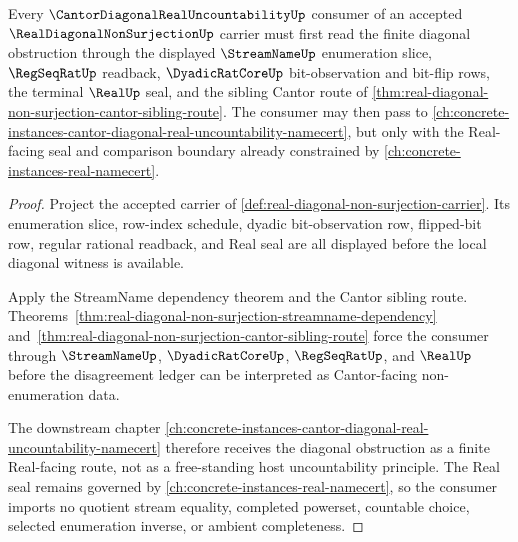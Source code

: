 \begin{theorem}
\label{thm:real-diagonal-non-surjection-forward-cantor-consumer-route}
Every $\CantorDiagonalRealUncountabilityUp$ consumer of an accepted $\RealDiagonalNonSurjectionUp$ carrier must first read the finite diagonal obstruction through the displayed $\StreamNameUp$ enumeration slice, $\RegSeqRatUp$ readback, $\DyadicRatCoreUp$ bit-observation and bit-flip rows, the terminal $\RealUp$ seal, and the sibling Cantor route of \autoref{thm:real-diagonal-non-surjection-cantor-sibling-route}. The consumer may then pass to \autoref{ch:concrete-instances-cantor-diagonal-real-uncountability-namecert}, but only with the Real-facing seal and comparison boundary already constrained by \autoref{ch:concrete-instances-real-namecert}.
\end{theorem}
\begin{proof}
Project the accepted carrier of \autoref{def:real-diagonal-non-surjection-carrier}. Its enumeration slice, row-index schedule, dyadic bit-observation row, flipped-bit row, regular rational readback, and Real seal are all displayed before the local diagonal witness is available.

Apply the StreamName dependency theorem and the Cantor sibling route. Theorems~\ref{thm:real-diagonal-non-surjection-streamname-dependency} and~\ref{thm:real-diagonal-non-surjection-cantor-sibling-route} force the consumer through $\StreamNameUp$, $\DyadicRatCoreUp$, $\RegSeqRatUp$, and $\RealUp$ before the disagreement ledger can be interpreted as Cantor-facing non-enumeration data.

The downstream chapter \autoref{ch:concrete-instances-cantor-diagonal-real-uncountability-namecert} therefore receives the diagonal obstruction as a finite Real-facing route, not as a free-standing host uncountability principle. The Real seal remains governed by \autoref{ch:concrete-instances-real-namecert}, so the consumer imports no quotient stream equality, completed powerset, countable choice, selected enumeration inverse, or ambient completeness.
\end{proof}
